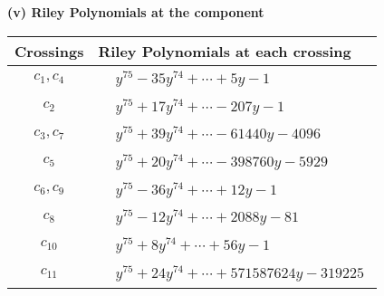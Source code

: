 \documentclass[1p]{elsarticle_modified}
\theoremstyle{definition}
\begin{document}
\newpage\renewcommand{\arraystretch}{1}
\flushleft \textbf{(v) Riley Polynomials at the component}\newline \\
\begin{tabular}{m{50pt}|m{274pt}}
Crossings & \hspace{64pt}Riley Polynomials at each crossing \\
\hline $$\begin{aligned}c_{1},c_{4}\end{aligned}$$&$\begin{aligned}
&y^{75}-35 y^{74}+\cdots+5 y-1
\end{aligned}$\\
\hline $$\begin{aligned}c_{2}\end{aligned}$$&$\begin{aligned}
&y^{75}+17 y^{74}+\cdots-207 y-1
\end{aligned}$\\
\hline $$\begin{aligned}c_{3},c_{7}\end{aligned}$$&$\begin{aligned}
&y^{75}+39 y^{74}+\cdots-61440 y-4096
\end{aligned}$\\
\hline $$\begin{aligned}c_{5}\end{aligned}$$&$\begin{aligned}
&y^{75}+20 y^{74}+\cdots-398760 y-5929
\end{aligned}$\\
\hline $$\begin{aligned}c_{6},c_{9}\end{aligned}$$&$\begin{aligned}
&y^{75}-36 y^{74}+\cdots+12 y-1
\end{aligned}$\\
\hline $$\begin{aligned}c_{8}\end{aligned}$$&$\begin{aligned}
&y^{75}-12 y^{74}+\cdots+2088 y-81
\end{aligned}$\\
\hline $$\begin{aligned}c_{10}\end{aligned}$$&$\begin{aligned}
&y^{75}+8 y^{74}+\cdots+56 y-1
\end{aligned}$\\
\hline $$\begin{aligned}c_{11}\end{aligned}$$&$\begin{aligned}
&y^{75}+24 y^{74}+\cdots+571587624 y-319225
\end{aligned}$\\
\hline
\end{tabular}\\~\\
\end{document}
